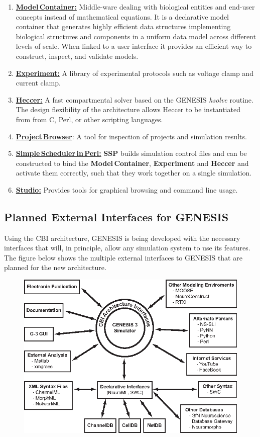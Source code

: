 \documentclass[12pt]{article}
\begin{document}
\begin{enumerate}
\item \href{../model-container/model-container.tex}{\bf Model\,Container:} Middle-ware dealing with biological entities and end-user concepts instead of mathematical equations. It is a declarative model container that generates highly efficient data structures implementing biological structures and components in a uniform data model across different levels of scale. When linked to a user interface it provides an efficient way to construct, inspect, and validate models.

\item \href{../experiment/experiment.tex}{\bf Experiment:} A library of experimental protocols such as voltage clamp and current clamp.

\item \href{../heccer/heccer.tex}{\bf Heccer:} A fast compartmental solver based on the GENESIS {\it hsolve} routine. The design flexibility of the architecture allows Heccer to be instantiated from from C, Perl, or other scripting languages.

\item {\href{../project-browser/project-browser.tex}{\bf Project\,Browser}:} A tool for inspection of projects and simulation results.

\item \href{../ssp/ssp.tex}{\bf Simple\,Scheduler\,in\,Perl:} {\bf SSP} builds simulation control files and can be constructed to bind the {\bf Model\,Container}, {\bf Experiment} and {\bf Heccer} and activate them correctly, such that they work together on a single simulation.

\item \href{../studio/studio.tex}{\bf Studio:} Provides tools for graphical browsing and command line usage.
\end{enumerate}

\subsection*{Planned External Interfaces for GENESIS}

Using the CBI architecture, GENESIS is being developed with the necessary interfaces that will, in principle, allow any simulation system to use its features. The figure below shows the multiple external interfaces to GENESIS that are planned for the new architecture.

\begin{figure}[h]
  \centering
 \includegraphics[scale=1.25]{figures/G3-Interfaces.eps}
  \label{fig:g3interfaces}
\end{figure}
\end{document}
